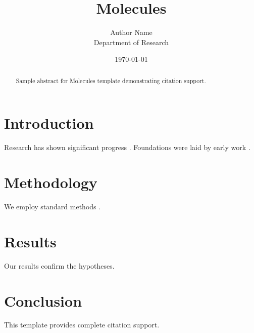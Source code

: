 \documentclass{mdpi}
\title{Molecules}
\author{Author Name \\ \small Department of Research}
\date{\today}
\begin{document}
\maketitle

\begin{abstract}
Sample abstract for Molecules template demonstrating citation support.
\end{abstract}

\section{Introduction}
Research has shown significant progress \citep{einstein1905}. Foundations were laid by early work \citep{turing1950}.

\section{Methodology}
We employ standard methods \citep{knuth1984}.

\section{Results}
Our results confirm the hypotheses.

\section{Conclusion}
This template provides complete citation support.



\end{document}
